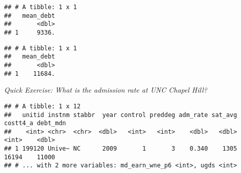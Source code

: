 \documentclass[
]{article}
\newenvironment{Shaded}{\begin{snugshade}}{\end{snugshade}}
\newcommand{\CommentTok}[1]{\textcolor[rgb]{0.56,0.35,0.01}{\textit{#1}}}
\newcommand{\DataTypeTok}[1]{\textcolor[rgb]{0.13,0.29,0.53}{#1}}
\newcommand{\DecValTok}[1]{\textcolor[rgb]{0.00,0.00,0.81}{#1}}
\newcommand{\KeywordTok}[1]{\textcolor[rgb]{0.13,0.29,0.53}{\textbf{#1}}}
\newcommand{\NormalTok}[1]{#1}
\newcommand{\OperatorTok}[1]{\textcolor[rgb]{0.81,0.36,0.00}{\textbf{#1}}}
\newcommand{\OtherTok}[1]{\textcolor[rgb]{0.56,0.35,0.01}{#1}}
\newcommand{\StringTok}[1]{\textcolor[rgb]{0.31,0.60,0.02}{#1}}
\begin{document}
\begin{verbatim}
## # A tibble: 1 x 1
##   mean_debt
##       <dbl>
## 1     9336.
\end{verbatim}

\begin{Shaded}
\end{Shaded}

\begin{verbatim}
## # A tibble: 1 x 1
##   mean_debt
##       <dbl>
## 1    11684.
\end{verbatim}

\emph{Quick Exercise: What is the admission rate at UNC Chapel Hill?}

\begin{Shaded}
\end{Shaded}

\begin{verbatim}
## # A tibble: 1 x 12
##   unitid instnm stabbr  year control preddeg adm_rate sat_avg costt4_a debt_mdn
##    <int> <chr>  <chr>  <dbl>   <int>   <int>    <dbl>   <dbl>    <int>    <dbl>
## 1 199120 Unive~ NC      2009       1       3    0.340    1305    16194    11000
## # ... with 2 more variables: md_earn_wne_p6 <int>, ugds <int>
\end{verbatim}
\end{document}
